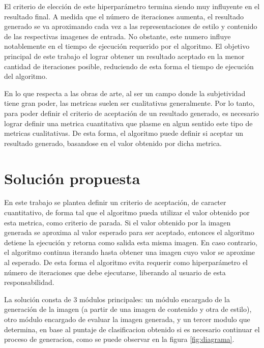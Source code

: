 \documentclass[a4paper,11pt,spanish]{book}
\begin{document}
    El criterio de elección de este hiperparámetro termina siendo muy influyente en el resultado final. A medida que el número de iteraciones
    aumenta, el resultado generado se va aproximando cada vez a las representaciones de estilo y contenido de las respectivas imagenes de entrada. 
    No obstante, este numero influye notablemente en el tiempo de ejecución requerido por el algoritmo. 
    El objetivo principal de este trabajo el lograr obtener un resultado aceptado en la menor cantidad de iteraciones posible, reduciendo de esta forma el tiempo de ejecución 
    del algoritmo.

    En lo que respecta a las obras de arte, al ser un campo donde la subjetividad tiene gran poder, las metricas suelen ser cualitativas generalmente. 
    Por lo tanto, para poder definir el criterio de aceptación de un resultado generado, es necesario lograr definir una metrica cuantitativa que plasme en algun sentido este tipo de 
    metricas cualitativas. De esta forma, el algoritmo puede definir si aceptar un resultado generado, basandose en el valor obtenido por dicha metrica.

  \section{Solución propuesta \label{sec:solucion}}
    En este trabajo se plantea definir un criterio de aceptación, de caracter cuantitativo, de forma tal que el algoritmo pueda utilizar el valor obtenido por esta metrica,
    como criterio de parada. Si el valor obtenido por la imagen generada se aproxima al valor esperado para ser aceptado, entonces el algoritmo detiene la ejecución y retorna
    como salida esta misma imagen. En caso contrario, el algoritmo continua iterando hasta obtener una imagen cuyo valor se aproxime al esperado.
    De esta forma el algoritmo evita requerir como hiperparámetro el número de iteraciones que debe ejecutarse, liberando al usuario de esta responsabilidad.
    
    La solución consta de 3 módulos principales: un módulo encargado de la generación de la imagen (a partir de una imagen de contenido y otra de estilo), otro módulo encargado de
    evaluar la imagen generada, y un tercer modulo que determina, en base al puntaje de clasificacion obtenido si es necesario continuar el proceso de generacion, como se puede
    observar en la figura \ref{fig:diagrama}.
\end{document}
